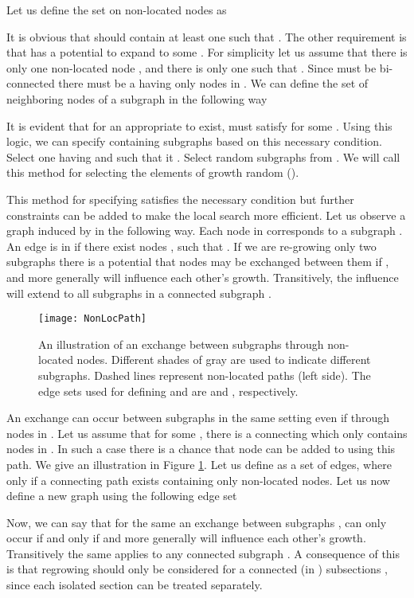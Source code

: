 Let us define the set on non-located nodes as
 
It is obvious that  should contain at least one  such that . The other requirement is that  has a potential to expand to some . For simplicity let us assume that there is only one non-located node , and there is only one  such that . Since  must be bi-connected there must be a  having only nodes in . We can define the set of neighboring nodes of a subgraph in the following way
 
It is evident that for an appropriate  to exist,  must satisfy  for some . Using this logic, we can specify  containing  subgraphs based on this necessary condition. Select one  having  and  such that it  . Select  random subgraphs from . We will call this method for selecting the elements of  growth random ().

This method for specifying  satisfies the necessary condition but further constraints can be added to make the local search more efficient. Let us observe a graph  induced by  in the following way.  Each node in   corresponds to a subgraph . An edge  is in   if there exist nodes ,  such that . If we are re-growing only two subgraphs  there is a potential that nodes may be exchanged between  them  if , and more generally  will influence each other's growth. Transitively, the influence will extend to all subgraphs in a connected subgraph .

\begin{figure}[tcb]
\centering
\texttt{[image: NonLocPath]}
\caption{An illustration of an exchange between subgraphs through non-located nodes. Different shades of gray are used to indicate different subgraphs. Dashed lines represent non-located paths (left side). The edge sets used for defining   and   are  and , respectively. }
\label{fig:NonLocPath}
\end{figure} 

An exchange can occur between subgraphs  in the same setting even if   through nodes in .     Let us assume that for some ,  there is a connecting  which only contains nodes in . In such a case there is a chance that node  can be added to  using this path. We give an illustration   in Figure \ref{fig:NonLocPath}. Let us define  as a set of edges, where   only if a connecting path exists containing only  non-located nodes.  Let us now define a new graph  using the following edge set 
 
Now, we can say that for the same  an exchange between subgraphs ,   can only occur if and only if  and more generally  will influence each other's growth. Transitively the same applies to any connected subgraph . A consequence of this is that  regrowing should only be considered for a connected (in ) subsections  , since each isolated section can be treated separately. 

